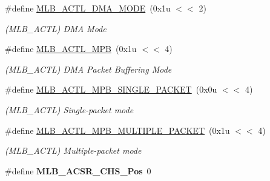 \begin{DoxyCompactItemize}
\mbox{\label{group__SAMV71__MLB_gaa471609dd0964f4b9d517b8103e11c56}} 
\#define \mbox{\hyperlink{group__SAMV71__MLB_gaa471609dd0964f4b9d517b8103e11c56}{M\+L\+B\+\_\+\+A\+C\+T\+L\+\_\+\+D\+M\+A\+\_\+\+M\+O\+DE}}~(0x1u $<$$<$ 2)
\begin{DoxyCompactList}\small\item\em (M\+L\+B\+\_\+\+A\+C\+TL) D\+MA Mode \end{DoxyCompactList}\item 
\mbox{\label{group__SAMV71__MLB_ga40280aaf37788e472020882c1e83c506}} 
\#define \mbox{\hyperlink{group__SAMV71__MLB_ga40280aaf37788e472020882c1e83c506}{M\+L\+B\+\_\+\+A\+C\+T\+L\+\_\+\+M\+PB}}~(0x1u $<$$<$ 4)
\begin{DoxyCompactList}\small\item\em (M\+L\+B\+\_\+\+A\+C\+TL) D\+MA Packet Buffering Mode \end{DoxyCompactList}\item 
\mbox{\label{group__SAMV71__MLB_ga948040d300994b567939f78d133e1a7c}} 
\#define \mbox{\hyperlink{group__SAMV71__MLB_ga948040d300994b567939f78d133e1a7c}{M\+L\+B\+\_\+\+A\+C\+T\+L\+\_\+\+M\+P\+B\+\_\+\+S\+I\+N\+G\+L\+E\+\_\+\+P\+A\+C\+K\+ET}}~(0x0u $<$$<$ 4)
\begin{DoxyCompactList}\small\item\em (M\+L\+B\+\_\+\+A\+C\+TL) Single-\/packet mode \end{DoxyCompactList}\item 
\mbox{\label{group__SAMV71__MLB_ga60501bb8b01bb788183d9454b4ce4f56}} 
\#define \mbox{\hyperlink{group__SAMV71__MLB_ga60501bb8b01bb788183d9454b4ce4f56}{M\+L\+B\+\_\+\+A\+C\+T\+L\+\_\+\+M\+P\+B\+\_\+\+M\+U\+L\+T\+I\+P\+L\+E\+\_\+\+P\+A\+C\+K\+ET}}~(0x1u $<$$<$ 4)
\begin{DoxyCompactList}\small\item\em (M\+L\+B\+\_\+\+A\+C\+TL) Multiple-\/packet mode \end{DoxyCompactList}\item 
\mbox{\label{group__SAMV71__MLB_ga52d0d91599f5554138c133b23e4d26a2}} 
\#define {\bfseries M\+L\+B\+\_\+\+A\+C\+S\+R\+\_\+\+C\+H\+S\+\_\+\+Pos}~0
\item 
\mbox{\label{group__SAMV71__MLB_ga27acfead22a0f6a44d1fd728dc429adc}} 

\end{DoxyCompactItemize}
